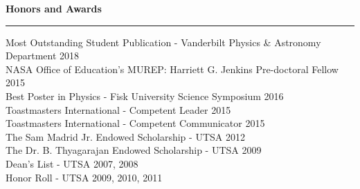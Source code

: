\documentclass[letter,11pt]{article}
\begin{document}

\noindent
{\bf Honors and Awards} \\
\vspace{-10mm}
\begin{center}
\rule{\textwidth}{0.2mm}
\end{center}
\vspace{-3mm}
\noindent
Most Outstanding Student Publication - Vanderbilt Physics \& Astronomy Department \hfill 2018 \\
NASA Office of Education's MUREP: Harriett G. Jenkins Pre-doctoral Fellow \hfill 2015 \\
Best Poster in Physics - Fisk University Science Symposium \hfill 2016 \\
Toastmasters International - Competent Leader \hfill 2015 \\
Toastmasters International - Competent Communicator \hfill 2015 \\
The Sam Madrid Jr. Endowed Scholarship - UTSA \hfill 2012 \\
The Dr. B. Thyagarajan Endowed Scholarship - UTSA \hfill 2009 \\
Dean’s List - UTSA \hfill 2007, 2008 \\
Honor Roll - UTSA \hfill 2009, 2010, 2011 \\
\end{document}
